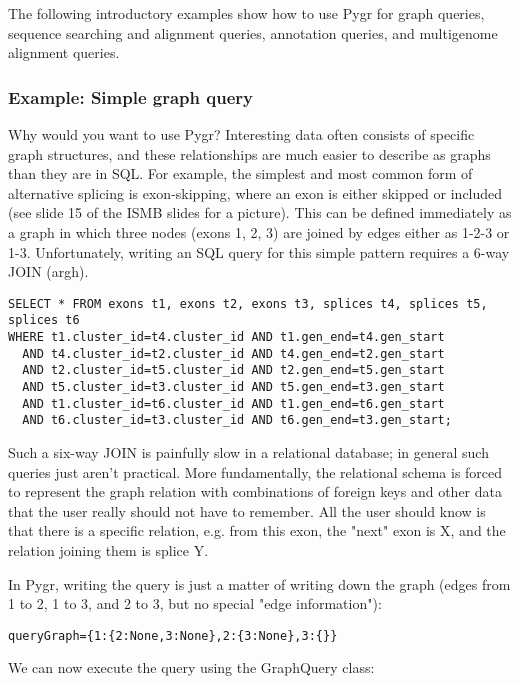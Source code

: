 \documentclass{howto}
\begin{document}
The following introductory examples show how to use Pygr for graph queries, sequence searching and alignment queries, annotation queries, and multigenome alignment queries.


\subsubsection{Example: Simple graph query}
Why would you want to use Pygr?  Interesting data often consists of specific graph structures, and these relationships are much easier to describe as graphs than they are in SQL.  For example, the simplest and most common form of alternative splicing is exon-skipping, where an exon is either skipped or included (see slide 15 of the ISMB slides for a picture).  This can be defined immediately as a graph in which three nodes (exons 1, 2, 3) are joined by edges either as 1-2-3 or 1-3.  Unfortunately, writing an SQL query for this simple pattern requires a 6-way JOIN (argh).

\begin{verbatim}
SELECT * FROM exons t1, exons t2, exons t3, splices t4, splices t5, splices t6 
WHERE t1.cluster_id=t4.cluster_id AND t1.gen_end=t4.gen_start 
  AND t4.cluster_id=t2.cluster_id AND t4.gen_end=t2.gen_start 
  AND t2.cluster_id=t5.cluster_id AND t2.gen_end=t5.gen_start 
  AND t5.cluster_id=t3.cluster_id AND t5.gen_end=t3.gen_start 
  AND t1.cluster_id=t6.cluster_id AND t1.gen_end=t6.gen_start 
  AND t6.cluster_id=t3.cluster_id AND t6.gen_end=t3.gen_start;
\end{verbatim}

Such a six-way JOIN is painfully slow in a relational database; in general such queries just aren't practical.  More fundamentally, the relational schema is forced to represent the graph relation with combinations of foreign keys and other data that the user really should not have to remember.  All the user should know is that there is a specific relation, e.g. from this exon, the "next" exon is X, and the relation joining them is splice Y.

In Pygr, writing the query is just a matter of writing down the graph (edges from 1 to 2, 1 to 3, and 2 to 3, but no special "edge information"):

\begin{verbatim}
queryGraph={1:{2:None,3:None},2:{3:None},3:{}}
\end{verbatim}

We can now execute the query using the GraphQuery class:
\end{document}
